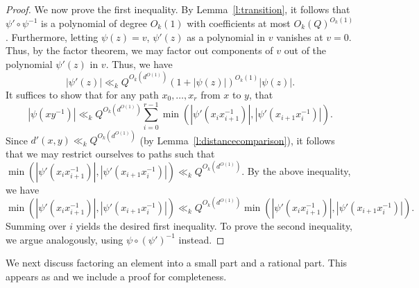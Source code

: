 \documentclass[11pt, a4paper]{amsart}
\theoremstyle{plain}
\theoremstyle{plain}
\theoremstyle{definition}
\theoremstyle{remark}
\numberwithin{equation}{section}
\numberwithin{lemma}{section}
\numberwithin{proposition}{section}
\numberwithin{corollary}{section}
\numberwithin{definition}{section}
\numberwithin{claim}{section}
\begin{document}
\begin{proof}
We now prove the first inequality. By Lemma~\ref{l:transition}, it follows that $\psi' \circ \psi^{-1}$ is a polynomial of degree $O_k(1)$ with coefficients at most $O_k(Q)^{O_k(1)}$. Furthermore, letting $\psi(z) = v$, $\psi'(z)$ as a polynomial in $v$ vanishes at $v = 0$. Thus, by the factor theorem, we may factor out components of $v$ out of the polynomial $\psi'(z)$ in $v$. Thus, we have
$$|\psi'(z)| \ll_k Q^{O_k(d^{O(1)})}(1 + |\psi(z)|)^{O_k(1)} |\psi(z)|.$$
It suffices to show that for any path $x_0, \dots, x_r$ from $x$ to $y$, that
$$|\psi(xy^{-1})| \ll_k Q^{O_k(d^{O(1)})} \sum_{i = 0}^{r - 1} \min(|\psi'(x_ix_{i + 1}^{-1})|, |\psi'(x_{i + 1}x_i^{-1})|).$$
Since $d'(x, y) \ll_k Q^{O_k(d^{O(1)})}$ (by Lemma~\ref{l:distancecomparison}), it follows that we may restrict ourselves to paths such that $\min(|\psi'(x_ix_{i + 1}^{-1})|, |\psi'(x_{i + 1}x_i^{-1})|) \ll_k Q^{O_k(d^{O(1)})}$. By the above inequality, we have
$$\min(|\psi'(x_ix_{i + 1}^{-1})|, |\psi'(x_{i + 1}x_i^{-1})|) \ll_k Q^{O_k(d^{O(1)})} \min(|\psi'(x_ix_{i + 1}^{-1})|, |\psi'(x_{i + 1}x_i^{-1})|).$$
Summing over $i$ yields the desired first inequality. To prove the second inequality, we argue analogously, using $\psi \circ (\psi')^{-1}$ instead.
\end{proof}
We next discuss factoring an element into a small part and a rational part. This appears as \cite[Lemma A.14]{GT12} and we include a proof for completeness.
\end{document}
